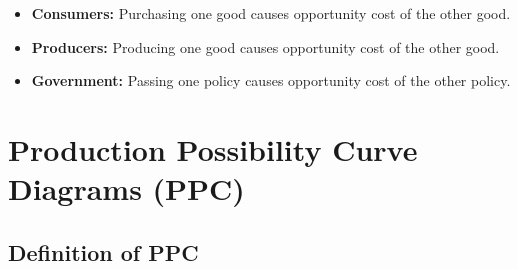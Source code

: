 \documentclass[11pt, a4paper, openany]{book}
\begin{document}
\begin{itemize}\itemsep0em
    \item \textbf{Consumers:} Purchasing one good causes opportunity cost of the other good.
    \item \textbf{Producers:} Producing one good causes opportunity cost of the other good.
    \item \textbf{Government:} Passing one policy causes opportunity cost of the other policy.
\end{itemize}

\section{Production Possibility Curve Diagrams (PPC)}

\subsection{Definition of PPC}
\end{document}
